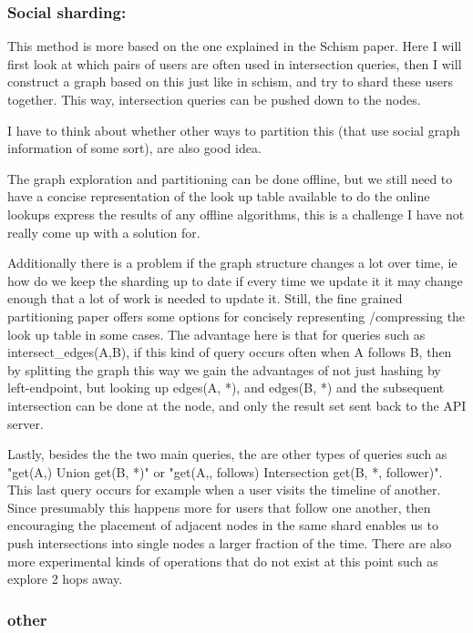 \documentclass[draft]{article}
\begin{document}
\subsubsection{Social sharding:}
This method is more based on the one explained in the Schism paper. Here I will first look at which pairs of users are often used in intersection queries, then I will construct a graph based on this just like in schism, and try to shard these users together. This way, intersection queries can be pushed down to the nodes.

I have to think about whether other ways to partition this (that use social graph information of some sort), are also  good idea.

The graph exploration and partitioning can be done offline, but we still need to have a concise representation of the look up table available to do the online lookups express the results of any offline algorithms, this is a challenge I have not really come up with a solution for. 

Additionally there is a problem if the graph structure changes a lot over time, ie how do we keep the sharding up to date if every time we update it it may change enough that a lot of work is needed to update it.  Still, the fine grained partitioning paper offers some options for concisely representing /compressing the look up table in some cases. The advantage here is that for queries such as intersect\_edges(A,B), if this kind of query occurs often when A follows B, then by splitting the graph this way we gain the advantages of not just hashing by left-endpoint, but looking up edges(A, *), and edges(B, *) and the subsequent intersection can be done at the node, and only the result set sent back to the API server.

Lastly, besides the the two main queries, the are other types of queries such as "get(A,) Union get(B, *)" or "get(A,, follows) Intersection get(B, *, follower)". This last query occurs for example when a user visits the timeline of another.  Since presumably this happens more for users that follow one another, then encouraging the placement of adjacent nodes in the same shard enables us to push intersections into single nodes a larger fraction of the time. There are also more experimental kinds of operations that do not exist at this point such as explore 2 hops away.

\subsubsection{other}
\end{document}
